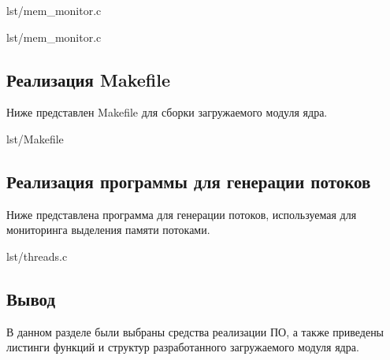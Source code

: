 \begin{lstinputlisting}[
        label={lst:},
        caption={Функция init загружаемого модуля},
        firstline=260,
        lastline=301,
    ]{lst/mem_monitor.c}
\end{lstinputlisting}

\begin{lstinputlisting}[
        label={lst:},
        caption={Функция exit загружаемого модуля},
        firstline=303,
        lastline=322,
    ]{lst/mem_monitor.c}
\end{lstinputlisting}

\subsection{Реализация Makefile}

Ниже представлен Makefile для сборки загружаемого модуля ядра.

\begin{lstinputlisting}[
        label={lst:Makefile},
        caption={Makefile},
        firstline=1,
        lastline=9,
    ]{lst/Makefile}
\end{lstinputlisting}

\newpage

\subsection{Реализация программы для генерации потоков}

Ниже представлена программа для генерации потоков, используемая для мониторинга выделения памяти потоками.

\begin{lstinputlisting}[
        label={lst:threads},
        caption={threads.c},
        firstline=1,
        lastline=25,
    ]{lst/threads.c}
\end{lstinputlisting}

\subsection*{Вывод}

В данном разделе были выбраны средства реализации ПО, а также приведены листинги функций и структур разработанного загружаемого модуля ядра.
